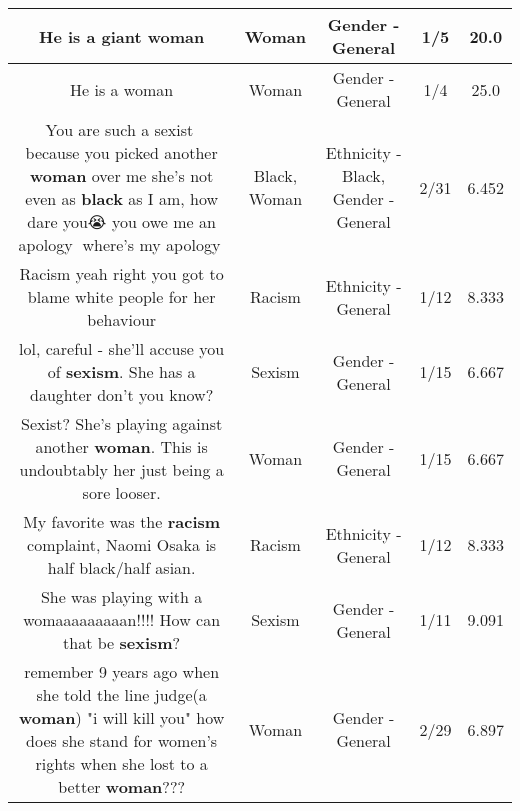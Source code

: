 \documentclass[11pt]{article}
\newlength\mylength
\begin{document}
\begin{center}
\begin{longtable}{|C{.65\mylength}|C{.30\mylength}|C{.12\mylength}|C{.12\mylength}|C{.12\mylength}|}
  \small He is a giant woman\normalsize   & Woman & Gender - General & 1/5 & 20.0 \\  \hline
  \small He is a woman\normalsize   & Woman & Gender - General & 1/4 & 25.0 \\  \hline
  \small You are such a sexist🐺 because you picked another \textbf{woman} over me she's not even as \textbf{black} as I am, how dare you😭 you owe me an apology🐑 where's my apology🐍\normalsize   & Black, Woman & Ethnicity - Black, Gender - General & 2/31 & 6.452 \\  \hline
  \small Racism yeah right you got to blame white people for her behaviour\normalsize   & Racism & Ethnicity - General & 1/12 & 8.333 \\  \hline
  \small lol, careful - she'll accuse you of \textbf{sexism}.  She has a daughter don't you know?\normalsize   & Sexism & Gender - General & 1/15 & 6.667 \\  \hline
  \small Sexist? She's playing against another \textbf{woman}. This is undoubtably her just being a sore looser.\normalsize   & Woman & Gender - General & 1/15 & 6.667 \\  \hline
  \small My favorite was the \textbf{racism} complaint, Naomi Osaka is half black/half asian.\normalsize   & Racism & Ethnicity - General & 1/12 & 8.333 \\  \hline
  \small She was playing with a womaaaaaaaaan!!!! How can that be \textbf{sexism}?\normalsize   & Sexism & Gender - General & 1/11 & 9.091 \\  \hline
  \small remember 9 years ago when she told the line judge(a \textbf{woman}) "i will kill you" how does she stand for women's rights when she lost to a better \textbf{woman}???\normalsize   & Woman & Gender - General & 2/29 & 6.897 \\  \hline

\end{longtable}
\end{center}
\end{document}
